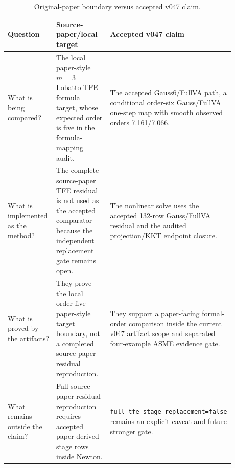 \documentclass[11pt]{article}
\newcommand{\method}{Gauss6/FullVA}
\newcommand{\tfe}{TFE}
\begin{document}
\begin{table}[t]
\centering
\caption{Original-paper boundary versus accepted v047 claim.}
\label{tab:source-paper-v047-boundary}
\begin{tabular}{P{0.24\linewidth}P{0.32\linewidth}P{0.32\linewidth}}
\toprule
Question & Source-paper/local target & Accepted v047 claim \\
\midrule
What is being compared? &
The local paper-style $m=3$ Lobatto-\tfe{} formula target, whose expected
order is five in the formula-mapping audit. &
The accepted \method{} path, a conditional order-six Gauss/FullVA one-step map
with smooth observed orders 7.161/7.066. \\
What is implemented as the method? &
The complete source-paper \tfe{} residual is not used as the accepted
comparator because the independent replacement gate remains open. &
The nonlinear solve uses the accepted 132-row Gauss/FullVA residual and the
audited projection/KKT endpoint closure. \\
What is proved by the artifacts? &
They prove the local order-five paper-style target boundary, not a completed
source-paper residual reproduction. &
They support a paper-facing formal-order comparison inside the current
v047 artifact scope and separated four-example ASME evidence gate. \\
What remains outside the claim? &
Full source-paper residual reproduction requires accepted paper-derived stage
rows inside Newton. &
\nolinkurl{full_tfe_stage_replacement=false} remains an explicit caveat and
future stronger gate. \\
\bottomrule
\end{tabular}
\end{table}
\end{document}
